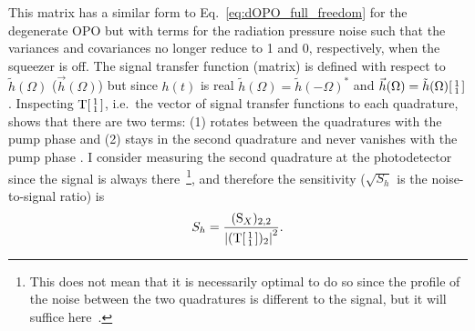 This matrix has a similar form to Eq.~\ref{eq:dOPO_full_freedom} for the degenerate OPO but with terms for the radiation pressure noise such that the variances and covariances no longer reduce to 1 and 0, respectively, when the squeezer is off. 
The signal transfer function (matrix) is defined with respect to $\tilde h(\Omega)$ ($\vec h(\Omega)$) but since $h(t)$ is real $\tilde h(\Omega)=\tilde h(-\Omega)^*$ and $\vec h(\Omega)=\tilde h(\Omega) \begin{bsmallmatrix}1 \\1\end{bsmallmatrix}$.
Inspecting $\text{T}\begin{bsmallmatrix}1 \\1\end{bsmallmatrix}$, i.e.\ the vector of signal transfer functions to each quadrature, shows that there are two terms: (1) rotates between the quadratures with the pump phase and (2) stays in the second quadrature and never vanishes with the pump phase . I consider measuring the second quadrature at the photodetector since the signal is always there~\footnote{This does not mean that it is necessarily optimal to do so since the profile of the noise between the two quadratures is different to the signal, but it will suffice here~\cite{}. }, and therefore the sensitivity ($\sqrt{S_h}$ is the noise-to-signal ratio) is
\begin{equation}
S_h = \frac{(\text{S}_X)_{2,2}}{\abs{(\text{T}\begin{bsmallmatrix}1 \\1\end{bsmallmatrix})_2}^2}.
\end{equation}

